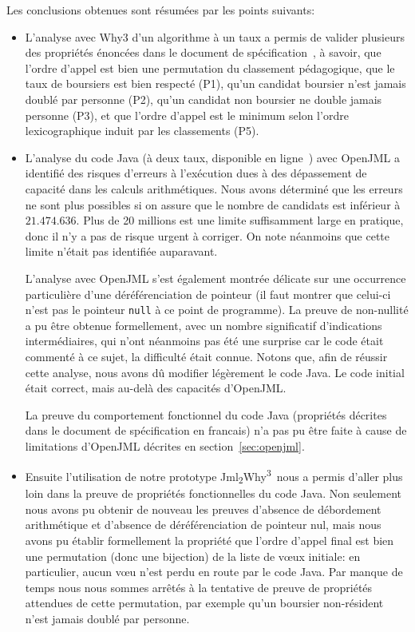 \documentclass[a4paper]{report}
\newcommand{\jmlwhy}{\texorpdfstring{Jml\textsubscript{2}Why\textsuperscript{3}}{Jml2Why3}}
\begin{document}
Les conclusions obtenues sont résumées par les points suivants:
\begin{itemize}
\item L'analyse avec Why3 d'un algorithme à un taux a permis de
  valider plusieurs des propriétés énoncées dans le document de
  spécification~\cite[page 7]{parcoursup-specifications}, à savoir,
  que l'ordre d'appel est bien une permutation du
  classement pédagogique, que
  le taux de boursiers est bien respecté (P1), qu'un candidat boursier
  n'est jamais doublé par personne (P2), qu'un candidat non boursier
  ne double jamais personne (P3), et que l’ordre d’appel est le minimum
  selon l’ordre lexicographique induit par les classements (P5).
\item L'analyse du code Java (à deux taux, disponible en ligne~\cite{parcoursup-source}) avec OpenJML a identifié des risques d'erreurs à
  l'exécution dues à des dépassement de capacité dans les calculs
  arithmétiques. Nous avons déterminé que les erreurs ne sont plus possibles si
  on assure que le nombre de candidats est inférieur à $21.474.636$. Plus de 20
  millions est une limite suffisamment large en pratique, donc il n'y a pas de
  risque urgent à corriger. On note néanmoins que cette limite n'était pas
  identifiée auparavant.

  L'analyse avec OpenJML s'est également montrée délicate sur une occurrence
  particulière d'une déréférenciation de pointeur (il faut montrer que celui-ci
  n'est pas le pointeur \texttt{null} à ce point de programme).  La preuve de
  non-nullité a pu être obtenue formellement, avec un nombre significatif
  d'indications intermédiaires, qui n'ont néanmoins pas été une surprise car le
  code était commenté à ce sujet, la difficulté était connue.  Notons que, afin
  de réussir cette analyse, nous avons dû modifier légèrement le code Java. Le
  code initial était correct, mais au-delà des capacités d'OpenJML.

  La preuve du comportement fonctionnel du code Java (propriétés décrites dans
  le document de spécification en francais) n'a pas pu être faite à cause de
  limitations d'OpenJML décrites en section~\ref{sec:openjml}.

\item Ensuite l'utilisation de notre prototype \jmlwhy\ nous a permis d'aller
  plus loin dans la preuve de propriétés fonctionnelles du code Java. Non
  seulement nous avons pu obtenir de nouveau les preuves d'absence de
  débordement
  arithmétique et d'absence de déréférenciation de pointeur nul, mais nous avons
  pu établir formellement la propriété que l'ordre d'appel final est bien une
  permutation (donc une bijection) de la liste de v{\oe}ux initiale: en
  particulier, aucun v{\oe}u n'est perdu en route par le code
  Java. Par
  manque de temps nous nous sommes arrêtés à la tentative de preuve de
  propriétés attendues de cette permutation, par exemple qu'un boursier
  non-résident n'est jamais doublé par personne.
\end{itemize}
\end{document}
